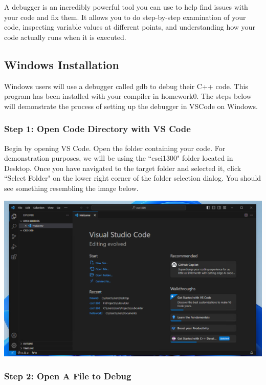 A debugger is an incredibly powerful tool you can use to help find issues with your code and fix them. It allows you to do step-by-step examination of your code, inspecting variable values at different points, and understanding how your code actually runs when it is executed.

\subsection{Windows Installation}

Windows users will use a debugger called gdb to debug their C++ code. This program has been installed with your compiler in homework0. The steps below will demonstrate the process of setting up the debugger in VSCode on Windows.

\subsubsection{Step 1: Open Code Directory with VS Code}

Begin by opening VS Code. Open the folder containing your code. For demonstration purposes, we will be using the ``csci1300" folder located in Desktop. Once you have navigated to the target folder and selected it, click ``Select Folder" on the lower right corner of the folder selection dialog. You should see something resembling the image below. 

\includegraphics[width=\textwidth]{images/windowsDebuggerSetup/debugger_windows_1.png}

\subsubsection{Step 2: Open A File to Debug}

